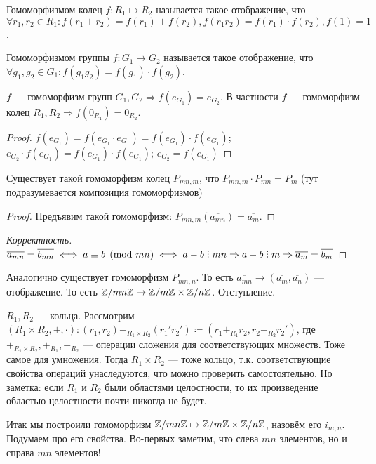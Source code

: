  \begin{definition}
     Гомоморфизмом колец $f: R_1 \mapsto R_2$ называется такое отображение, что $\forall r_1, r_2 \in R_1: f(r_1 + r_2) = f(r_1) + f(r_2), f(r_1r_2)=f(r_1)\cdot f(r_2), f(1) = 1$.
\end{definition}
\begin{definition}
    Гомоморфизмом группы $f: G_1 \mapsto G_2$ называется такое отображение, что $\forall g_1, g_2 \in G_1: f(g_1g_2) = f(g_1) \cdot f(g_2)$.
\end{definition}
\begin{remark}
    $f$ --- гомоморфизм групп  $G_1, G_2 \Rightarrow f(e_{G_1}) = e_{G_2}$.  В частности  $f$ --- гомоморфизм колец  $R_1,R_2 \Rightarrow f(0_{R_1}) = 0_{R_2}$.
\end{remark}
\begin{proof}
	$f(e_{G_1}) = f(e_{G_1} \cdot e_{G_1}) = f(e_{G_1}) \cdot f(e_{G_1})$; $e_{G_2} \cdot f(e_{G_1}) = f(e_{G_1}) \cdot f(e_{G_1})$; $e_{G_2} = f(e_{G_1})$
\end{proof}
\slashn

Существует такой гомоморфизм колец $P_{mn,m}$, что $P_{mn, m} \cdot P_{mn} = P_{m}$ (тут подразумевается композиция гомоморфизмов)
 \begin{proof}
     Предъявим такой гомоморфизм: $P_{mn, m}(\overline{a_{mn}}) = \overline{a_m}$.
\end{proof}
\begin{proof}[Корректность]
	$\overline{a_{mn}} = \overline{b_{mn}} \iff a \equiv b \pmod{mn} \iff a-b \divby mn \Rightarrow a-b \divby m \Rightarrow \overline{a_m} = \overline{b_m}$
\end{proof}
\slashn Аналогично существует гомоморфизм $P_{mn, n}$. То есть $\overline{a_{mn}} \rightarrow (\overline{a_m}, \overline{a_n})$ --- отображение. То есть $\mathbb{Z} / mn \mathbb{Z} \mapsto \mathbb{Z} / m\mathbb{Z} \times \mathbb{Z} / n \mathbb{Z}$.
Отступление.
\begin{definition}
	$R_1, R_2$ --- кольца. Рассмотрим  $(R_1 \times R_2, +, \cdot): (r_1, r_2) +_{R_1\times R_2} (r_1'r_2') \coloneqq (r_1+_{R_1}r_2, r_2+_{R_2}r_2')$, где $+_{R_1\times R_2}, +_{R_1}, +_{R_2}$ --- операции сложения для соответствующих множеств. Тоже самое для умножения. Тогда $R_1 \times R_2$ --- тоже кольцо, т.к. соответствующие свойства операций унаследуются, что можно проверить самостоятельно. Но заметка: если $R_1$ и $R_2$ были областями целостности, то их произведение областью целостности почти никогда не будет.
\end{definition}
\slashn
Итак мы построили гомоморфизм $\mathbb{Z} / mn \mathbb{Z} \mapsto \mathbb{Z} / m\mathbb{Z} \times \mathbb{Z} / n \mathbb{Z}$, назовём его $i_{m, n}$. Подумаем про его свойства. Во-первых заметим, что слева $mn$ элементов, но и справа $mn$ элементов!

